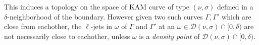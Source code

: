 \documentclass[12pt, openany]{amsart}
\newtheorem{theorem}{Theorem}%
\theoremstyle{definition}
\theoremstyle{remark}
\theoremstyle{remark}
\theoremstyle{theorem}
\theoremstyle{theorem}
\theoremstyle{theorem}
\theoremstyle{theorem}
\begin{document}
This induces a topology on the space of KAM curve of type $(\nu,\sigma)$ defined in a $\delta$-neighborhood of the boundary. However given two such curves $\Gamma,\Gamma'$ which are close from eachother, the $\ell$-jets in $\omega$ of $\Gamma$ and $\Gamma'$ at an $\omega \in \mathcal D(\nu,\sigma)\cap[0,\delta)$ are not necessarily close to eachother, unless $\omega$ is a \textit{density point} of $\mathcal D(\nu,\sigma)\cap[0,\delta)$.
%
%
%
%
%


\bigskip 
\end{document}
